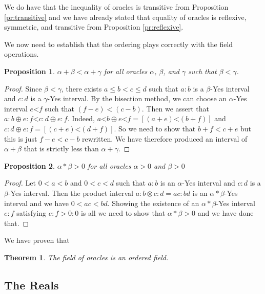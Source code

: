 \documentclass[12pt]{article}
\newtheorem{theorem}{Theorem}
\newtheorem{proposition}{Proposition}
\theoremstyle{remark}
\newcommand{\lt}{\mathord{<}}
\begin{document}
We do have that the inequality of oracles is transitive from Proposition \ref{pr:transitive} and we have already stated that equality of oracles is reflexive, symmetric, and transitive from Proposition \ref{pr:reflexive}. 

We now need to establish that the ordering plays correctly with the field operations. 

\begin{proposition}\label{pr:addinq}
 $\alpha + \beta < \alpha + \gamma$ for all oracles $\alpha$, $\beta$, and $\gamma$ such that $\beta < \gamma$.
\end{proposition}

\begin{proof}
Since $\beta < \gamma$, there exists $a\leq b<c\leq d$ such that $a:b$ is a $\beta$-Yes interval and $c:d$ is a $\gamma$-Yes interval. By the bisection method, we can choose an $\alpha$-Yes interval $e\lt f$ such that $ (f-e) <  (c-b)$. Then we assert that $a:b \oplus e:f \lt  c:d \oplus e:f$. Indeed, $a\lt b \oplus e \lt f = [(a+e) \lt (b+f)]$ and $c:d \oplus e:f = [(c+e)\lt (d+f)]$. So we need to show that $b+f< c+e$ but this is just $f-e < c-b$ rewritten. We have therefore produced an interval of $\alpha+\beta$ that is strictly less than $\alpha+\gamma$. 
\end{proof}


\begin{proposition}
$\alpha*\beta > 0$ for all oracles $\alpha>0$ and $\beta>0$ 
\end{proposition}

\begin{proof}
Let $0 < a < b$ and $0<c<d$ such that $a:b$ is an $\alpha$-Yes interval and $c:d$ is a $\beta$-Yes interval. Then the product interval $a:b \otimes c:d = ac:bd$ is an $\alpha*\beta$-Yes interval and we have $0 < ac < bd$. Showing the existence of an $\alpha*\beta$-Yes interval $e:f$ satisfying $e:f > 0:0$ is all we need to show that $\alpha*\beta > 0$ and we have done that.  
\end{proof}

We have proven that

\begin{theorem}
The field of oracles is an ordered field.
\end{theorem}

\subsection{The Reals}
\end{document}
